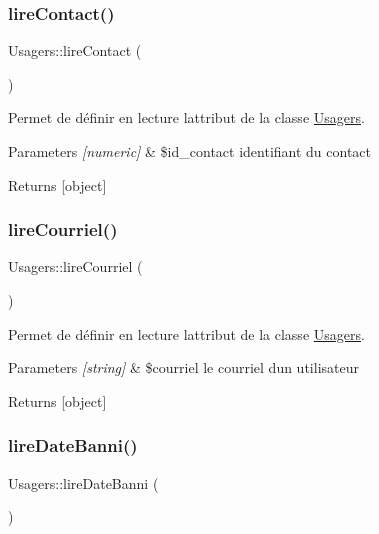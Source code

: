 \subsubsection{\texorpdfstring{lire\+Contact()}{lireContact()}}
{\footnotesize\ttfamily Usagers\+::lire\+Contact (\begin{DoxyParamCaption}{ }\end{DoxyParamCaption})}



Permet de définir en lecture l\textquotesingle{}attribut de la classe \hyperlink{class_usagers}{Usagers}. 


\begin{DoxyParams}{Parameters}
{\em \mbox{[}numeric\mbox{]}} & \$id\+\_\+contact identifiant du contact \\
\hline
\end{DoxyParams}
\begin{DoxyReturn}{Returns}
\mbox{[}object\mbox{]} 
\end{DoxyReturn}
\mbox{\label{class_usagers_a6a748b7883d25cd8e0d86f7668ae985c}} 
\subsubsection{\texorpdfstring{lire\+Courriel()}{lireCourriel()}}
{\footnotesize\ttfamily Usagers\+::lire\+Courriel (\begin{DoxyParamCaption}{ }\end{DoxyParamCaption})}



Permet de définir en lecture l\textquotesingle{}attribut de la classe \hyperlink{class_usagers}{Usagers}. 


\begin{DoxyParams}{Parameters}
{\em \mbox{[}string\mbox{]}} & \$courriel le courriel d\textquotesingle{}un utilisateur \\
\hline
\end{DoxyParams}
\begin{DoxyReturn}{Returns}
\mbox{[}object\mbox{]} 
\end{DoxyReturn}
\mbox{\label{class_usagers_a20a2c86f2e3ff23e342769f1046058df}} 
\subsubsection{\texorpdfstring{lire\+Date\+Banni()}{lireDateBanni()}}
{\footnotesize\ttfamily Usagers\+::lire\+Date\+Banni (\begin{DoxyParamCaption}{ }\end{DoxyParamCaption})}



